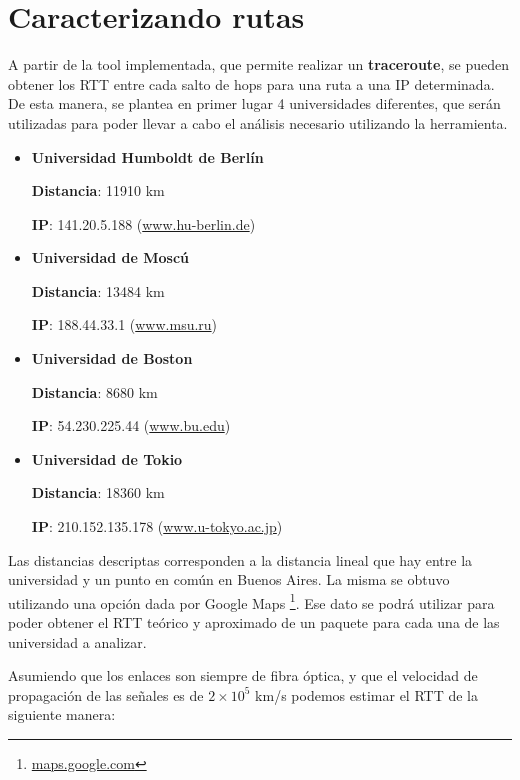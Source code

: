 \section{Caracterizando rutas}

A partir de la tool implementada, que permite realizar un \textbf{traceroute}, se pueden obtener los RTT entre cada salto de hops para una ruta a una IP determinada. De esta manera, se plantea en primer lugar 4 universidades diferentes, que serán utilizadas para poder llevar a cabo el análisis necesario utilizando la herramienta.

\begin{itemize}
 \item {\bf Universidad Humboldt de Berlín}

	{\bf Distancia}: 11910 km

	{\bf IP}: 141.20.5.188 (\url{www.hu-berlin.de}{})

 \item {\bf Universidad de Moscú}

	{\bf Distancia}: 13484 km

	{\bf IP}: 188.44.33.1 (\url{www.msu.ru}{})

 \item {\bf Universidad de Boston}

	{\bf Distancia}: 8680 km

	{\bf IP}: 54.230.225.44 (\url{www.bu.edu}{})

 \item {\bf Universidad de Tokio}

	{\bf Distancia}: 18360 km

	{\bf IP}: 210.152.135.178 (\url{www.u-tokyo.ac.jp}{})

\end{itemize}

Las distancias descriptas corresponden a la distancia lineal que hay entre la universidad y un punto en común en Buenos Aires. La misma se obtuvo utilizando una opción dada por Google Maps \footnote{\url{maps.google.com}{}}. Ese dato se podrá utilizar para poder obtener el RTT teórico y aproximado de un paquete para cada una de las universidad a analizar.

Asumiendo que los enlaces son siempre de fibra óptica, y que el velocidad de propagación de las señales es de $2 \times 10^{5}$ km/s podemos estimar el RTT de la siguiente manera:


